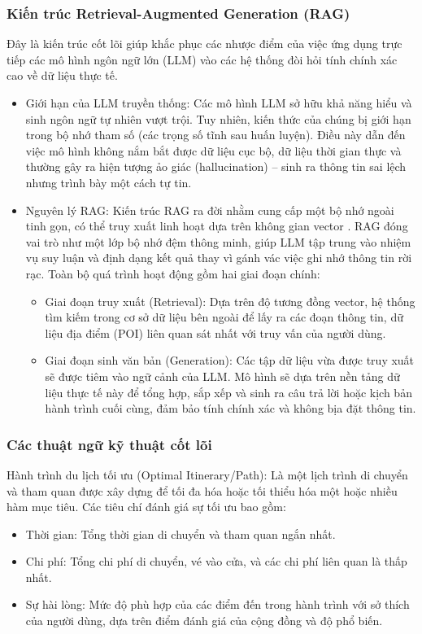 \subsubsection{Kiến trúc Retrieval-Augmented Generation (RAG)}
Đây là kiến trúc cốt lõi giúp khắc phục các nhược điểm của việc ứng dụng trực tiếp các mô hình ngôn ngữ lớn (LLM) vào các hệ thống đòi hỏi tính chính xác cao về dữ liệu thực tế.

\begin{itemize}
    \item Giới hạn của LLM truyền thống: Các mô hình LLM sở hữu khả năng hiểu và sinh ngôn ngữ tự nhiên vượt trội. Tuy nhiên, kiến thức của chúng bị giới hạn trong bộ nhớ tham số (các trọng số tĩnh sau huấn luyện). Điều này dẫn đến việc mô hình không nắm bắt được dữ liệu cục bộ, dữ liệu thời gian thực và thường gây ra hiện tượng ảo giác (hallucination) – sinh ra thông tin sai lệch nhưng trình bày một cách tự tin.
    \item Nguyên lý RAG: Kiến trúc RAG ra đời nhằm cung cấp một bộ nhớ ngoài tinh gọn, có thể truy xuất linh hoạt dựa trên không gian vector \cite{lewis-2020, gao-2023}. RAG đóng vai trò như một lớp bộ nhớ đệm thông minh, giúp LLM tập trung vào nhiệm vụ suy luận và định dạng kết quả thay vì gánh vác việc ghi nhớ thông tin rời rạc. Toàn bộ quá trình hoạt động gồm hai giai đoạn chính:
    \begin{itemize}
        \item Giai đoạn truy xuất (Retrieval): Dựa trên độ tương đồng vector, hệ thống tìm kiếm trong cơ sở dữ liệu bên ngoài để lấy ra các đoạn thông tin, dữ liệu địa điểm (POI) liên quan sát nhất với truy vấn của người dùng.
        \item Giai đoạn sinh văn bản (Generation): Các tập dữ liệu vừa được truy xuất sẽ được tiêm vào ngữ cảnh của LLM. Mô hình sẽ dựa trên nền tảng dữ liệu thực tế này để tổng hợp, sắp xếp và sinh ra câu trả lời hoặc kịch bản hành trình cuối cùng, đảm bảo tính chính xác và không bịa đặt thông tin.
    \end{itemize}
\end{itemize}

\subsubsection{Các thuật ngữ kỹ thuật cốt lõi}
Hành trình du lịch tối ưu (Optimal Itinerary/Path): Là một lịch trình di chuyển và tham quan được xây dựng để tối đa hóa hoặc tối thiểu hóa một hoặc nhiều hàm mục tiêu. Các tiêu chí đánh giá sự tối ưu bao gồm:
\begin{itemize}
    \item Thời gian: Tổng thời gian di chuyển và tham quan ngắn nhất.
    \item Chi phí: Tổng chi phí di chuyển, vé vào cửa, và các chi phí liên quan là thấp nhất.
    \item Sự hài lòng: Mức độ phù hợp của các điểm đến trong hành trình với sở thích của người dùng, dựa trên điểm đánh giá của cộng đồng và độ phổ biến.
\end{itemize}

